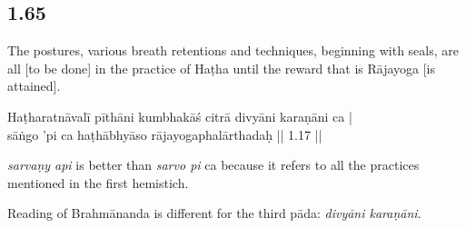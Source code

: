 \begin{ekdosis}
\subsection*{1.65}
\begin{translation}[hp01_065]
The postures, various breath retentions and techniques, beginning with seals, are all [to be done] in the practice of Haṭha until the reward that is Rājayoga [is attained].
\end{translation}

\begin{sources}[hp01_065]
\end{sources}

\begin{testimonia}[hp01_065]
Haṭharatnāvalī
\startverse
pīthāni kumbhakāś citrā divyāni karaṇāni ca |\\
sāṅgo 'pi ca haṭhābhyāso rājayogaphalārthadaḥ || 1.17 ||
\endverse
\end{testimonia}

\begin{philcomm}[hp01_065]
\emph{sarvaṇy api} is better than \emph{sarvo pi} ca because it refers to all the practices mentioned in the first hemistich.

Reading of Brahmānanda is different for the third pāda: \emph{divyāni karaṇāni}.
\end{philcomm}

\end{ekdosis}

